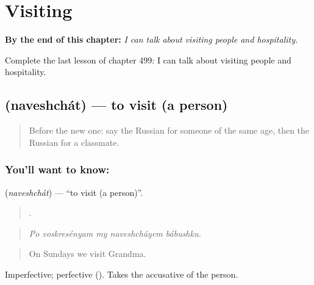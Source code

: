 
\chapter{Visiting}
\label{ch:ru-visiting}

\begin{chapteropening}
\textbf{By the end of this chapter:} \emph{I can talk about visiting people and hospitality.}

Complete the last lesson of chapter 499: I can talk about visiting people and hospitality.
\end{chapteropening}

\section[\texorpdfstring{\ru{навещать} (naveshchát)}{навещать (naveshchát)}]{ (naveshchát) — to visit (a person)}

\label{lesson:RU-C499-naveshchat}



\begin{quote}
Before the new one: say the Russian for someone of the same age, then the Russian for a classmate.
\end{quote}

\subsection*{You'll want to know: }
\textbf{} (\emph{naveshchát}) — \textquotedblleft{}to visit (a person)\textquotedblright{}.

\begin{quote}
    .
\end{quote}

\begin{quote}
\emph{Po voskresényam my naveshcháyem bábushku.}
\end{quote}

\begin{quote}
On Sundays we visit Grandma.
\end{quote}

Imperfective; perfective  (). Takes the accusative of the person.

